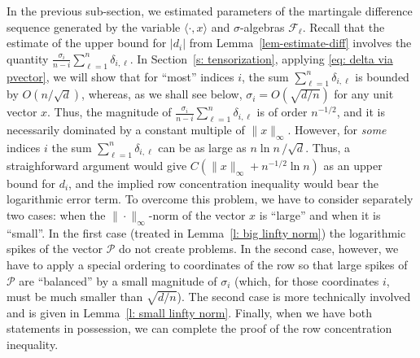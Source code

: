 \documentclass[12pt]{article}
\theoremstyle{definition}
\theoremstyle{plain}
\def\pvector{{\mathcal P}}
\begin{document}
\medskip

In the previous sub-section, we estimated parameters of the martingale difference sequence
generated by the variable $\langle \cdot,x\rangle$ and $\sigma$-algebras $\mathcal F_\ell$.
Recall that
the estimate of the upper bound for $|d_i|$ from Lemma~\ref{lem-estimate-diff} involves
the quantity $\frac{\sigma_i}{n-i} \sum_{\ell=1}^n \delta_{i,\ell}$.
In Section~\ref{s: tensorization}, applying \eqref{eq: delta via pvector},
we will show that for ``most'' indices $i$, the sum $\sum_{\ell=1}^n \delta_{i,\ell}$
is bounded by $O(n/\sqrt{d})$, whereas, as we shall see below, $\sigma_i=O(\sqrt{d/n})$ for any unit vector $x$.
Thus, the magnitude of $\frac{\sigma_i}{n-i} \sum_{\ell=1}^n \delta_{i,\ell}$
is of order $n^{-1/2}$, and it is necessarily dominated by a constant multiple of $\|x\|_\infty$.
However, for {\it some} indices $i$ the sum $\sum_{\ell=1}^n \delta_{i,\ell}$
can be as large as $n\ln n\,/\sqrt{d}$. Thus, a straighforward argument would give
$C(\|x\|_\infty +n^{-1/2}\ln n)$ as an upper bound for $d_i$, and the implied row concentration inequality
would bear the logarithmic error term. To overcome this problem, we have to consider separately two cases:
when the $\|\cdot\|_\infty$-norm of the vector $x$ is ``large'' and when it is ``small''. In the first case
(treated in Lemma~\ref{l: big linfty norm})
the logarithmic spikes of the vector $\pvector$ do not create problems.
In the second case, however, we have to apply a special ordering to coordinates of the row so that
large spikes of $\pvector$ are ``balanced'' by a small magnitude of $\sigma_i$ (which, for those coordinates $i$,
must be much smaller than $\sqrt{d/n}$). The second case is more technically involved and is given in Lemma~\ref{l: small linfty norm}.
Finally, when we have both statements in possession, we can complete the proof of the row concentration inequality.
\end{document}
